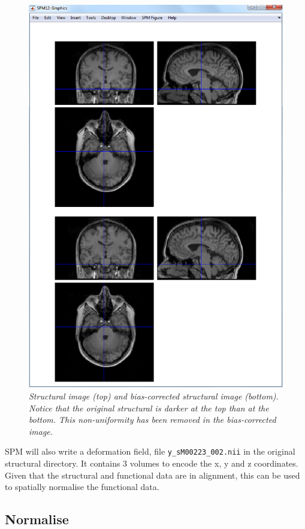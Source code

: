 \begin{figure}
\begin{center}
\includegraphics[width=125mm]{auditory/bias}
\caption{\em Structural image (top) and bias-corrected structural image (bottom). Notice that the original structural is darker at the top than at the bottom. This non-uniformity has been removed in the bias-corrected image.\label{aud_bias}}
\end{center}
\end{figure}

SPM will also write a deformation field, file \texttt{y\_sM00223\_002.nii} in the original structural directory. It contains 3 volumes to encode the x, y and z coordinates. Given that the structural and functional data are in alignment, this can be used to spatially normalise the functional data. 

\subsection{Normalise}

